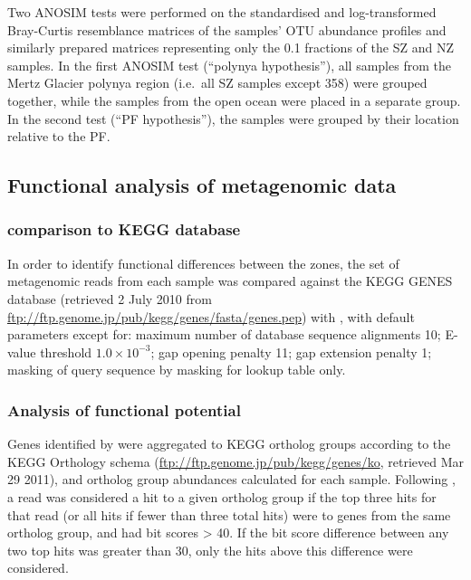 

Two \ac{ANOSIM} tests were performed on the standardised and log-transformed Bray-Curtis resemblance matrices of the samples' \ac{OTU} abundance profiles and similarly prepared matrices representing only the 0.1 \micron{} fractions of the \ac{SZ} and \ac{NZ} samples.
In the first \ac{ANOSIM} test (``polynya hypothesis''), all samples from the Mertz Glacier polynya region (i.e.\ all \ac{SZ} samples except 358) were grouped together, while the samples from the open ocean were placed in a separate group.
In the second test (``\ac{PF} hypothesis''), the samples were grouped by their location relative to the \ac{PF}.

\subsection{Functional analysis of metagenomic data}

\subsubsection{ comparison to KEGG database}

In order to identify functional differences between the zones, the set of metagenomic reads from each sample was compared against the \ac{KEGG} GENES database (retrieved 2 July 2010 from \url{ftp://ftp.genome.jp/pub/kegg/genes/fasta/genes.pep}) with , with default parameters except for: maximum number of database sequence alignments 10; E-value threshold $1.0\times10^{-3}$; gap opening penalty 11; gap extension penalty 1; masking of query sequence by  masking for lookup table only.

\subsubsection{Analysis of functional potential}

Genes identified by  were aggregated to \ac{KEGG} ortholog groups according to the \ac{KEGG} Orthology schema (\url{ftp://ftp.genome.jp/pub/kegg/genes/ko}, retrieved Mar 29 2011), and ortholog group abundances calculated for each sample. 
Following \citet{Coleman:2010jj}, a read was considered a hit to a given ortholog group if the top three hits for that read (or all hits if fewer than three total hits) were to genes from the same ortholog group, and had bit scores \textgreater{} 40. 
If the bit score difference between any two top hits was greater than 30, only the hits above this difference were considered.


